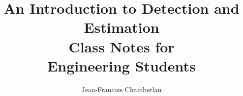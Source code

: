 \documentclass[12pt,openany]{book}
\begin{document}
\author{Jean-Francois Chamberlan}
\title{
\Huge{An Introduction to Detection and Estimation}\\[5mm]
\Large{Class Notes for\\Engineering Students}}

\frontmatter
\maketitle




%

\mainmatter

%
%
%
%


\end{document}

